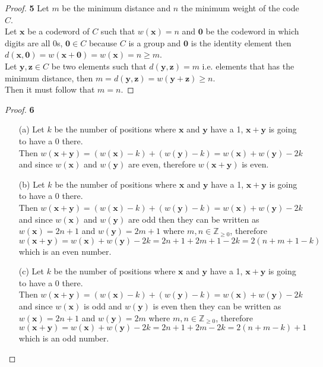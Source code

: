 \documentclass[11pt]{article}
\begin{document}
\cleardoublepage
	\begin{proof}{\textbf{5}}
		Let $m$ be the minimum distance and $n$ the minimum weight of the code $C$.\\
		Let $\bm{x}$ be a codeword of $C$ such that $w(\bm{x})=n$ and $\bm{0}$ be the codeword in which digits are all 0s, $\bm{0} \in C$ because $C$ is a group and $\bm{0}$ is the identity element then $d(\bm{x,0})=w(\bm{x+0})=w(\bm{x})=n \geq m$.\\
		Let $\bm{y,z} \in C$ be two elements such that $d(\bm{y,z})=m$ i.e. elements that has the minimum distance, then $m = d(\bm{y,z})=w(\bm{y+z}) \geq n$.\\
		Then it must follow that $m = n$.
	\end{proof}
	\begin{proof}{\textbf{6}}
		\begin{itemize}
			\item[(a)] Let $k$ be the number of positions where $\bm{x}$ and $\bm{y}$ have a 1, $\bm{x+y}$ is going to have a 0 there.\\
			Then $w(\bm{x+y})=(w(\bm{x})-k) + (w(\bm{y})-k)=w(\bm{x})+w(\bm{y})-2k$ and since $w(\bm{x})$ and $w(\bm{y})$ are even, therefore $w(\bm{x+y})$ is even.
			\item[(b)] Let $k$ be the number of positions where $\bm{x}$ and $\bm{y}$ have a 1, $\bm{x+y}$ is going to have a 0 there.\\
			Then $w(\bm{x+y})=(w(\bm{x})-k) + (w(\bm{y})-k)=w(\bm{x})+w(\bm{y})-2k$ and since $w(\bm{x})$ and $w(\bm{y})$ are odd then they can be written as $w(\bm{x}) = 2n + 1$ and $w(\bm{y}) = 2m + 1$ where $m,n \in \mathbb{Z}_{\geq 0}$, therefore\\ $w(\bm{x+y})=w(\bm{x})+w(\bm{y})-2k=2n+1+2m+1-2k=2(n+m+1-k)$ which is an even number.
			\item[(c)] Let $k$ be the number of positions where $\bm{x}$ and $\bm{y}$ have a 1, $\bm{x+y}$ is going to have a 0 there.\\
			Then $w(\bm{x+y})=(w(\bm{x})-k) + (w(\bm{y})-k)=w(\bm{x})+w(\bm{y})-2k$ and since $w(\bm{x})$ is odd and $w(\bm{y})$ is even then they can be written as $w(\bm{x}) = 2n+1$ and $w(\bm{y}) = 2m$ where $m,n \in \mathbb{Z}_{\geq 0}$, therefore\\ $w(\bm{x+y})=w(\bm{x})+w(\bm{y})-2k=2n+1+2m-2k=2(n+m-k)+1$ which is an odd number.
		\end{itemize}
	\end{proof}
\end{document}
